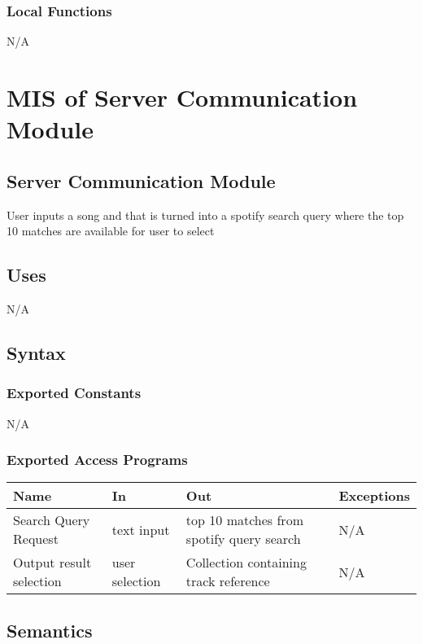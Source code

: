 \documentclass[12pt, titlepage]{article}
\begin{document}
\subsubsection{Local Functions}
N/A

\section{MIS of Server Communication Module} 

\subsection{Server Communication Module}
User inputs a song and that is turned into a spotify search query where the top 10 matches are available for user to select

\subsection{Uses}
N/A

\subsection{Syntax}

\subsubsection{Exported Constants}
N/A

\subsubsection{Exported Access Programs}

\begin{center}
\begin{tabular}{p{2cm} p{4cm} p{4cm} p{2cm}}
\hline
\textbf{Name} & \textbf{In} & \textbf{Out} & \textbf{Exceptions}\\
\hline%
Search Query Request &text input &top 10 matches from spotify query search &N/A\\
Output result selection &user selection &Collection containing track reference &N/A\\
\hline
\end{tabular}
\end{center}

\subsection{Semantics}
\end{document}
